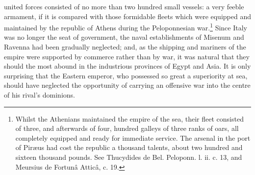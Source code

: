 united forces consisted of no more than two hundred small vessels: a very feeble armament, if it is compared with those formidable fleets which were equipped and maintained by the republic of Athens during the Peloponnesian war.\footnote{Whilst the Athenians maintained the empire of the sea, their fleet consisted of three, and afterwards of four, hundred galleys of three ranks of oars, all completely equipped and ready for immediate service. The arsenal in the port of Piræus had cost the republic a thousand talents, about two hundred and sixteen thousand pounds. See Thucydides de Bel. Peloponn. l. ii. c. 13, and Meursius de Fortunâ Atticâ, c. 19.} Since Italy was no longer the seat of government, the naval establishments of Misenum and Ravenna had been gradually neglected; and, as the shipping and mariners of the empire were supported by commerce rather than by war, it was natural that they should the most abound in the industrious provinces of Egypt and Asia. It is only surprising that the Eastern emperor, who possessed so great a superiority at sea, should have neglected the opportunity of carrying an offensive war into the centre of his rival\texthebrew{}’s dominions.

